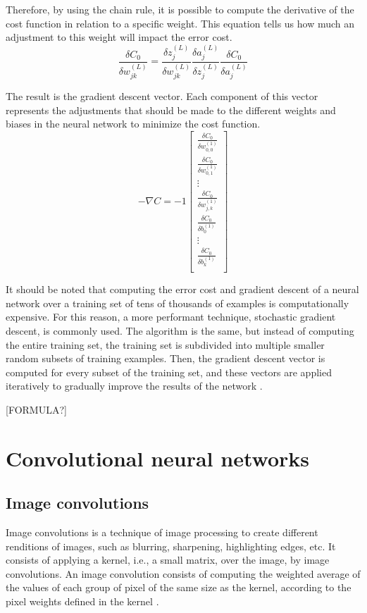 \documentclass[12pt,a4paper,notitlepage]{article}
\begin{document}
Therefore, by using the chain rule, it is possible to compute the derivative of the cost function in relation to a specific weight. This equation tells us how much an adjustment to this weight will impact the error cost.
\begin{displaymath}
	\frac{\delta C_0}{\delta w_{jk}^{(L)}} = 
	\frac{\delta z_j^{(L)}}{\delta w_{jk}^{(L)}}
	\frac{\delta a_j^{(L)}}{\delta z_j^{(L)}}
	\frac{\delta C_0}{\delta a_j^{(L)}}
\end{displaymath}

The result is the gradient descent vector. Each component of this vector represents the adjustments that should be made to the different weights and biases in the neural network to minimize the cost function.
\begin{displaymath}
	-\nabla C =
	-1 \begin{bmatrix}
		\frac{\delta C_0}{\delta w_{0,0}^{(1)}}\\
		\frac{\delta C_0}{\delta w_{0,1}^{(1)}}\\
		\vdots\\
		\frac{\delta C_0}{\delta w_{j,k}^{(1)}}\\
		\frac{\delta C_0}{\delta b_{0}^{(1)}}\\
		\vdots\\
		\frac{\delta C_0}{\delta b_{k}^{(1)}}\\
	\end{bmatrix}
\end{displaymath}

It should be noted that computing the error cost and gradient descent of a neural network over a training set of tens of thousands of examples is computationally expensive. For this reason, a more performant technique, stochastic gradient descent, is commonly used. The algorithm is the same, but instead of computing the entire training set, the training set is subdivided into multiple smaller random subsets of training examples. Then, the gradient descent vector is computed for every subset of the training set, and these vectors are applied iteratively to gradually improve the results of the network \cite{sanderson_gradient_2017}.

[FORMULA?]

\section{Convolutional neural networks}

\subsection{Image convolutions}
Image convolutions is a technique of image processing to create different renditions of images, such as blurring, sharpening, highlighting edges, etc. It consists of applying a kernel, i.e., a small matrix, over the image, by image convolutions. An image convolution consists of computing the weighted average of the values of each group of pixel of the same size as the kernel, according to the pixel weights defined in the kernel \cite{sanderson_convolutions_2020}.
\end{document}
